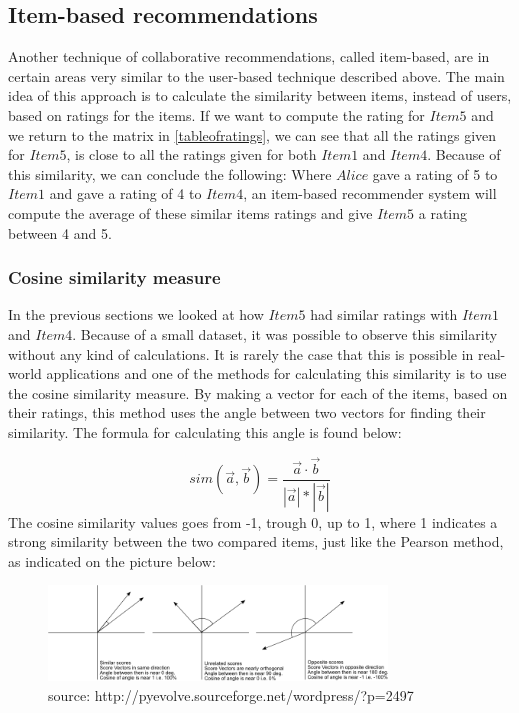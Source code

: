 \subsection{Item-based recommendations} %
\label{sub:item_based_recommendations}
Another technique of collaborative recommendations, called item-based, are in certain areas very similar to the user-based technique described above. The main idea of this approach is to calculate the similarity between items, instead of users, based on ratings for the items. If we want to compute the rating for \(Item5\) and we return to the matrix in \ref{tableofratings}, we can see that all the ratings given for \(Item5\), is close to all the ratings given for both \(Item1\) and \(Item4\). Because of this similarity, we can conclude the following: Where \(Alice\) gave a rating of 5 to \(Item1\) and gave a rating of 4 to \(Item4\), an item-based recommender system will compute the average of these similar items ratings and give \(Item5\) a rating between 4 and 5.

\subsubsection{Cosine similarity measure}
In the previous sections we looked at how \(Item5\) had similar ratings with \(Item1\) and \(Item4\). Because of a small dataset, it was possible to observe this similarity without any kind of calculations. It is rarely the case that this is possible in real-world applications and one of the methods for calculating this similarity is to use the cosine similarity measure. \newline 
By making a vector for each of the items, based on their ratings, this method uses the angle between two vectors for finding their similarity. The formula for calculating this angle is found below:

\[
	sim(\vec{a}, \vec{b}) = \frac{\vec{a} \cdot \vec{b}}{|\vec{a}| * |\vec{b}| }
\]
\newline
The cosine similarity values goes from -1, trough 0, up to 1, where 1 indicates a strong similarity between the two compared items, just like the Pearson method, as indicated on the picture below:

\begin{figure}[H]
\centering
\includegraphics[width=90mm]{Pictures/cosinesimilarity.png}
\caption{source: http://pyevolve.sourceforge.net/wordpress/?p=2497}
\label{cosinesimilarity}
\end{figure}

